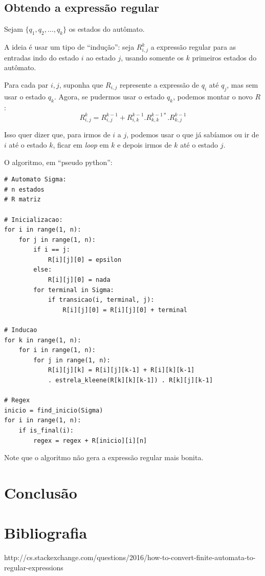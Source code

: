 \documentclass[a4 paper, 12pt]{article}
\begin{document}
\subsection{Obtendo a express\~ao regular}
Sejam $\{q_1, q_2, \ldots, q_k\}$ os estados do aut\^omato.

A ideia \'e usar um tipo de ``indu\c c\~ao'': seja $R_{i,j}^k$
a express\~ao regular para as entradas indo do estado $i$ ao estado
$j$, usando somente os $k$ primeiros estados do aut\^omato.

Para cada par $i, j$, suponha que $R_{i,j}$ represente a express\~ao
de $q_i$ at\'e $q_j$, mas sem usar o estado $q_k$. Agora, se pudermos
usar o estado $q_k$, podemos montar o novo $R$:
\begin{equation}
  \label{eq:1}
  R_{i,j}^{k} = R_{i,j}^{k-1} + R_{i,k}^{k-1} . R_{k,k}^{k-1*}. R_{k,j}^{k-1}
\end{equation}

Isso quer dizer que, para irmos de $i$ a $j$, podemos usar o que j\'a
sab\'iamos ou ir de $i$ at\'e o estado $k$, ficar em \emph{loop} em
$k$ e depois irmos de $k$ at\'e o estado $j$.

O algoritmo, em ``pseudo python'':
\begin{verbatim}
# Automato Sigma:
# n estados
# R matriz

# Inicializacao:
for i in range(1, n):
    for j in range(1, n):
        if i == j:
            R[i][j][0] = epsilon
        else:
            R[i][j][0] = nada
        for terminal in Sigma:
            if transicao(i, terminal, j):
                R[i][j][0] = R[i][j][0] + terminal

# Inducao
for k in range(1, n):
    for i in range(1, n):
        for j in range(1, n):
            R[i][j][k] = R[i][j][k-1] + R[i][k][k-1]
            . estrela_kleene(R[k][k][k-1]) . R[k][j][k-1]

# Regex
inicio = find_inicio(Sigma)
for i in range(1, n):
    if is_final(i):
        regex = regex + R[inicio][i][n]
\end{verbatim}

Note que o algoritmo n\~ao gera a express\~ao regular mais bonita.

\section{Conclus\~ao}

\newpage
\section{Bibliografia}
http://cs.stackexchange.com/questions/2016/how-to-convert-finite-automata-to-regular-expressions
\end{document}
